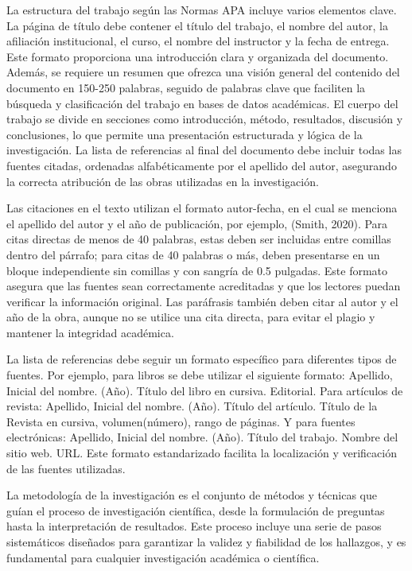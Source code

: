 \documentclass[12pt]{article}
\begin{document}
La estructura del trabajo según las Normas APA incluye varios elementos clave. La página de título debe contener el título del trabajo, el nombre del autor, la afiliación institucional, el curso, el nombre del instructor y la fecha de entrega. Este formato proporciona una introducción clara y organizada del documento. Además, se requiere un resumen que ofrezca una visión general del contenido del documento en 150-250 palabras, seguido de palabras clave que faciliten la búsqueda y clasificación del trabajo en bases de datos académicas. El cuerpo del trabajo se divide en secciones como introducción, método, resultados, discusión y conclusiones, lo que permite una presentación estructurada y lógica de la investigación. La lista de referencias al final del documento debe incluir todas las fuentes citadas, ordenadas alfabéticamente por el apellido del autor, asegurando la correcta atribución de las obras utilizadas en la investigación.

Las citaciones en el texto utilizan el formato autor-fecha, en el cual se menciona el apellido del autor y el año de publicación, por ejemplo, (Smith, 2020). Para citas directas de menos de 40 palabras, estas deben ser incluidas entre comillas dentro del párrafo; para citas de 40 palabras o más, deben presentarse en un bloque independiente sin comillas y con sangría de 0.5 pulgadas. Este formato asegura que las fuentes sean correctamente acreditadas y que los lectores puedan verificar la información original. Las paráfrasis también deben citar al autor y el año de la obra, aunque no se utilice una cita directa, para evitar el plagio y mantener la integridad académica.

La lista de referencias debe seguir un formato específico para diferentes tipos de fuentes. Por ejemplo, para libros se debe utilizar el siguiente formato: Apellido, Inicial del nombre. (Año). Título del libro en cursiva. Editorial. Para artículos de revista: Apellido, Inicial del nombre. (Año). Título del artículo. Título de la Revista en cursiva, volumen(número), rango de páginas. Y para fuentes electrónicas: Apellido, Inicial del nombre. (Año). Título del trabajo. Nombre del sitio web. URL. Este formato estandarizado facilita la localización y verificación de las fuentes utilizadas.

La metodología de la investigación es el conjunto de métodos y técnicas que guían el proceso de investigación científica, desde la formulación de preguntas hasta la interpretación de resultados. Este proceso incluye una serie de pasos sistemáticos diseñados para garantizar la validez y fiabilidad de los hallazgos, y es fundamental para cualquier investigación académica o científica.
\end{document}
